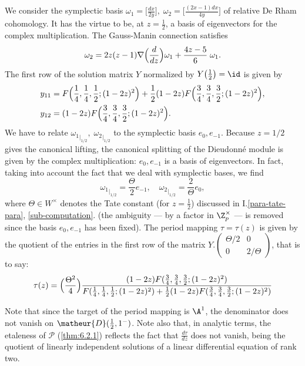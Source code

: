 \begin{para}
 We consider the symplectic basis $\omega_1=\bigl[\frac{dx}{2y}\bigr],\;
 \omega_2=\bigl[\frac{(2x-1)dx}{4y}\bigr]$ of relative De Rham
 cohomology.  It has 
 the virtue to be, at $z=\frac{1}{2}$, a basis of eigenvectors for the
 complex multiplication. The Gauss-Manin connection satisfies
 \begin{equation*}
  \omega_2=2z(z-1)\nabla\Bigl(\frac{d}{dz}\Bigr)\omega_1 +
  \frac{4z-5}{6}\;\omega_1.
 \end{equation*} 
 The first row of the
 solution matrix $Y$ normalized by $Y\bigl(\frac{1}{2}\bigr)=\id$ is given by
 \begin{align*}
  y_{11} &=
  F\Bigl(\frac{1}{4},\frac{1}{4},\frac{1}{2};(1-2z)^2\Bigr) +
  \frac{1}{2}(1-2z)F\Bigl(\frac{3}{4},\frac{3}{4},\frac{3}{2};(1-2z)^2\Bigr),\\
  y_{12} &=
  (1-2z)F\Bigl(\frac{3}{4},\frac{3}{4},\frac{3}{2};(1-2z)^2\Bigr).
 \end{align*}
 We have to relate ${\omega_1}_{|_{1/2}},\;
 {\omega_2}_{|_{1/2}}$ to the symplectic basis $e_0,e_{-1}$. Because
 $z=1/2$ gives the canonical lifting, the canonical splitting of the
 Dieudonn\'e module is given by the complex multiplication: $e_0,e_{-1}$
 is a basis of eigenvectors. In fact, taking into account the fact that
 we deal with symplectic bases, we find
 \begin{equation*}
  {\omega_1}_{|_{1/2}}=\frac{\Theta}{2}e_{-1},\quad
   {\omega_2}_{|_{1/2}}=\frac{2}{\Theta}e_0,
 \end{equation*}
 where $\Theta\in W^\times$ denotes the Tate constant
 (for $z=\frac{1}{2}$) discussed in I.\ref{para-tate-para},
 \ref{sub-computation}. (the ambiguity --- by a 
 factor in $\Z_p^\times$ --- is removed since the basis $e_0,e_{-1}$ has 
 been fixed).  The period mapping $\tau=\tau(z)$ is given by the quotient
 of the entries in the first row of the matrix
 $Y.\begin{pmatrix}
     {\Theta/2}&0\\
     0&{2/\Theta}
    \end{pmatrix}$, that is to say:
 \begin{equation*}
  \tau(z)=\Bigl(\frac{\Theta^2}{4}\Bigr)\frac{(1-2z)F(\frac{3}{4},\frac{3}{4},
   \frac{3}{2};(1-2z)^2)}{F(\frac{1}{4},\frac{1}{4},
   \frac{1}{2};(1-2z)^2)+\frac{1}{2}(1-2z)F(\frac{3}{4},
   \frac{3}{4},\frac{3}{2};(1-2z)^2)}
 \end{equation*}
 
 Note that since the target of the period mapping is $\A^1$, the
 denominator does not vanish on $\matheur{D}(\frac{1}{2},1^-)$. Note
 also that, in 
 analytic terms, the etaleness of $\mathcal{P}$ (\ref{thm:6.2.1}) reflects the
 fact that $\frac{d\tau}{dz}$ does not vanish, being the quotient of
 linearly independent solutions of a linear differential equation of
 rank two.
\end{para}

